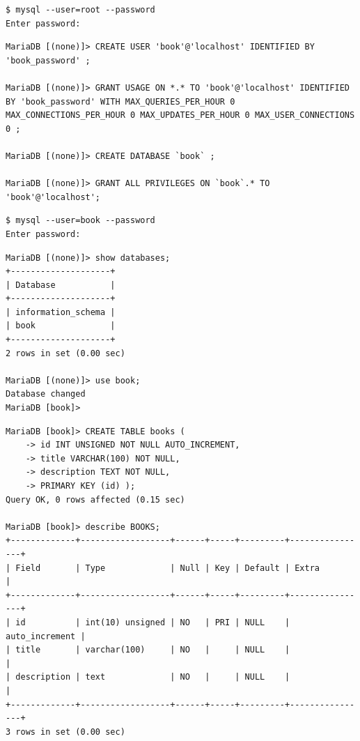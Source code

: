 \documentclass{assignment}
\begin{document}
\begin{verbatim}
$ mysql --user=root --password
Enter password: 
\end{verbatim} 


\begin{verbatim}
MariaDB [(none)]> CREATE USER 'book'@'localhost' IDENTIFIED BY 'book_password' ;

MariaDB [(none)]> GRANT USAGE ON *.* TO 'book'@'localhost' IDENTIFIED BY 'book_password' WITH MAX_QUERIES_PER_HOUR 0 MAX_CONNECTIONS_PER_HOUR 0 MAX_UPDATES_PER_HOUR 0 MAX_USER_CONNECTIONS 0 ;

MariaDB [(none)]> CREATE DATABASE `book` ;

MariaDB [(none)]> GRANT ALL PRIVILEGES ON `book`.* TO 'book'@'localhost';

\end{verbatim}

\begin{verbatim}
$ mysql --user=book --password
Enter password: 
\end{verbatim} 


\begin{verbatim}
MariaDB [(none)]> show databases;
+--------------------+
| Database           |
+--------------------+
| information_schema |
| book               |
+--------------------+
2 rows in set (0.00 sec)

MariaDB [(none)]> use book;
Database changed
MariaDB [book]> 

\end{verbatim}

\begin{verbatim}
MariaDB [book]> CREATE TABLE books (
    -> id INT UNSIGNED NOT NULL AUTO_INCREMENT,
    -> title VARCHAR(100) NOT NULL,
    -> description TEXT NOT NULL,
    -> PRIMARY KEY (id) );
Query OK, 0 rows affected (0.15 sec)

MariaDB [book]> describe BOOKS;
+-------------+------------------+------+-----+---------+----------------+
| Field       | Type             | Null | Key | Default | Extra          |
+-------------+------------------+------+-----+---------+----------------+
| id          | int(10) unsigned | NO   | PRI | NULL    | auto_increment |
| title       | varchar(100)     | NO   |     | NULL    |                |
| description | text             | NO   |     | NULL    |                |
+-------------+------------------+------+-----+---------+----------------+
3 rows in set (0.00 sec)


\end{verbatim}
\end{document}
